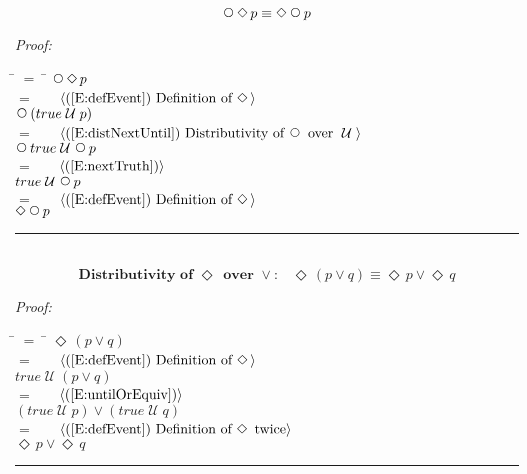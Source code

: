 \documentclass[fleqn, leqno]{article}
\newcommand{\lgap}{2pt}                             %
\newcommand{\mymathindent}{24pt}                    %
\newcommand{\Until}{\;\mathcal{U}\;}
\newcommand{\Next}{\;\,\text{\raisebox{3.5pt}{\circle{6}}}}
\newcommand{\Event}{\Diamond\,}
\newcommand{\myqed}{\hfill\rule[-.23ex]{1.2ex}{2.0ex}}
\newcommand{\Gll} {\langle}                         %
\newcommand{\Ggg} {\rangle}                         %
\newcommand{\Hint}[1]     {\ \ \ $\Gll              \mbox{#1} \Ggg$ }   %
\begin{document}
\begin{equation}\label{E:dNextEvent}
\Next\Event p \equiv \Event\Next p
\end{equation}

\emph{Proof:}
\begin{tabbing}
\hspace{\mymathindent} \= $= \;$ \= \kill
  \> \>   $\Next\Event p$\\[\lgap]
  \> $=$  \>  \Hint{(\ref{E:defEvent}) Definition of $\Event$}\\[\lgap]
  \> \>   $\Next(true \Until p)$\\[\lgap]
  \> $=$  \>  \Hint{(\ref{E:distNextUntil}) Distributivity of $\Next$ over $\Until$}\\[\lgap]
  \> \>   $\Next true \Until \Next p$\\[\lgap]
  \> $=$  \>  \Hint{(\ref{E:nextTruth})}\\[\lgap]
  \> \>   $true \Until \Next p$\\[\lgap]
  \> $=$  \>  \Hint{(\ref{E:defEvent}) Definition of $\Event$}\\[\lgap]
  \> \>   $\Event\Next p$\\[\lgap]
\end{tabbing}
\myqed\\[\lgap]


\begin{equation}\label{E:distEventOr}
\textbf{Distributivity of $\Event$ over $\lor$:}\quad \Event(p \lor q) \equiv \Event p \lor \Event q
\end{equation}

\emph{Proof:}
\begin{tabbing}
\hspace{\mymathindent} \= $= \;$ \= \kill
  \> \>   $\Event(p \lor q)$\\[\lgap]
  \> $=$  \>  \Hint{(\ref{E:defEvent}) Definition of $\Event$}\\[\lgap]
  \> \>   $true \Until (p \lor q)$\\[\lgap]
  \> $=$  \>  \Hint{(\ref{E:untilOrEquiv})}\\[\lgap]
  \> \>   $(true \Until p) \lor (true \Until q)$\\[\lgap]
  \> $=$  \>  \Hint{(\ref{E:defEvent}) Definition of $\Event$ twice}\\[\lgap]
  \> \>   $\Event p \lor \Event q$\\[\lgap]
\end{tabbing}
\myqed\\[\lgap]
\end{document}
